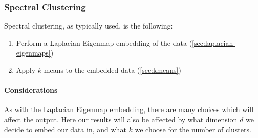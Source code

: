 \documentclass[12pt,a4paper]{article}
\newcommand{\1}[1]{\mathds{1}\left[#1\right]}
\begin{document}
\subsubsection{Spectral Clustering}
Spectral clustering, as typically used, is the following:
\begin{enumerate}
    \item Perform a Laplacian Eigenmap embedding of the data (\ref{sec:laplacian-eigenmaps})
    \item Apply $k$-means to the embedded data (\ref{sec:kmeans})
\end{enumerate}

\paragraph{Considerations} As with the Laplacian Eigenmap embedding, there are many choices which will affect the output. Here our results will also be affected by what dimension $d$ we decide to embed our data in, and what $k$ we choose for the number of clusters.

\printbibliography
\end{document}
